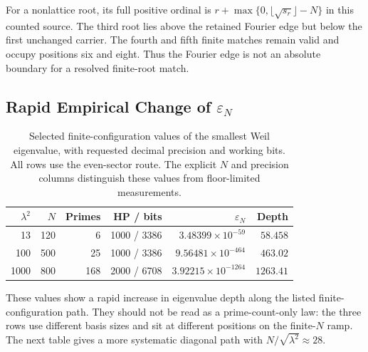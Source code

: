 \documentclass[11pt,a4paper]{article}
\begin{document}
For a nonlattice root, its full positive ordinal is
$r+\max\{0,\lfloor\sqrt{s_r}\rfloor-N\}$ in this counted source.
The third root lies above the retained Fourier edge but below the
first unchanged carrier. The fourth and fifth finite matches remain
valid and occupy positions six and eight. Thus the Fourier edge is
not an absolute boundary for a resolved finite-root match.

\subsection{\texorpdfstring{Rapid Empirical Change of $\varepsilon_N$}
{Rapid Empirical Change of epsilon-N}}
\label{sec:eps_n}

\begin{table}[!htbp]
\centering
\caption{Selected finite-configuration values of the smallest Weil
eigenvalue, with requested decimal precision and working bits.
All rows use the even-sector route. The explicit $N$ and precision
columns distinguish these values from floor-limited measurements.}
\label{tab:eps_N}
\begin{tabular}{@{}rrrrrr@{}}
\toprule
$\lambda^2$ & $N$ & Primes & HP / bits & $\varepsilon_N$ & Depth \\
\midrule
13   & 120 & 6   & 1000 / 3386 & $3.48399\times10^{-59}$   & $58.458$ \\
100  & 500 & 25  & 1000 / 3386 & $9.56481\times10^{-464}$  & $463.02$ \\
1000 & 800 & 168 & 2000 / 6708 & $3.92215\times10^{-1264}$ & $1263.41$ \\
\bottomrule
\end{tabular}
\end{table}

These values show a rapid increase in eigenvalue depth along the
listed finite-configuration path. They should not be read as a
prime-count-only law: the three rows use different basis sizes and sit
at different positions on the finite-$N$ ramp. The next table gives a
more systematic diagonal path with
$N/\sqrt{\lambda^2}\approx28$.
\end{document}
